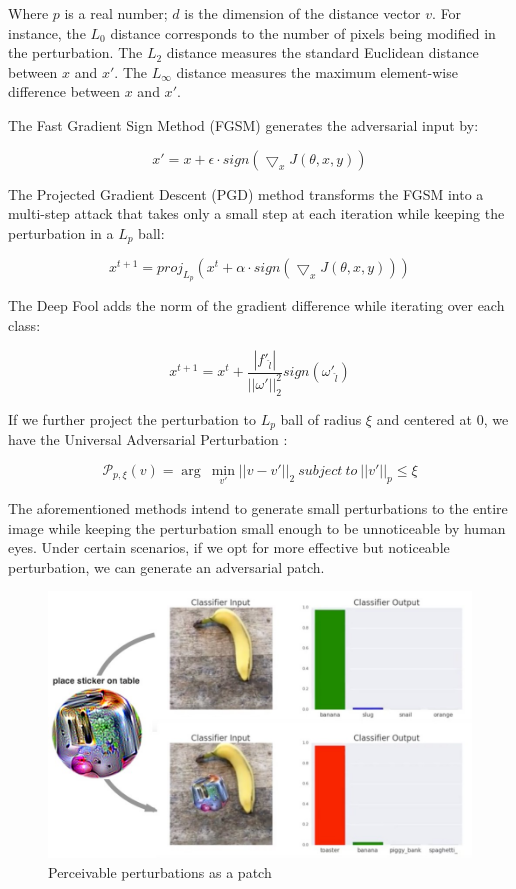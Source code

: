 Where $p$ is a real number; $d$ is the dimension of the distance vector $v$. For instance, the $L_0$ distance corresponds to the number of pixels being modified in the perturbation. The $L_2$ distance measures the standard Euclidean distance between $x$ and $x'$. The $L_\infty$ distance measures the maximum element-wise difference between $x$ and $x'$.

The Fast Gradient Sign Method (FGSM) \cite{goodfellow2015explaining} generates the adversarial input by:

$$ x' = x + \epsilon \cdot sign(\bigtriangledown_x J(\theta, x, y)) $$

The Projected Gradient Descent (PGD) \cite{madry2017towards} method transforms the FGSM into a multi-step attack that takes only a small step at each iteration while keeping the perturbation in a $L_p$ ball:

$$ x^{t+1} = proj_{L_p}(x^t + \alpha \cdot sign(\bigtriangledown_x J(\theta, x, y))) $$

The Deep Fool \cite{moosavidezfooli2016deepfool} adds the norm of the gradient difference while iterating over each class:

$$ x^{t+1} = x^t + \frac{|f'_{\hat{l}}|}{||\omega'||^2_2} sign(\omega'_{\hat{l}})$$

If we further project the perturbation to $L_p$ ball of radius $\xi$ and centered at 0, we have the Universal Adversarial Perturbation \cite{moosavidezfooli2017universal}:

$$\mathcal{P}_{p, \xi}(v) = \arg\ \underset{v'}{\min}||v-v'||_2\ subject\ to\ ||v'||_p\leq\xi$$


The aforementioned methods intend to generate small perturbations to the entire image while keeping the perturbation small enough to be unnoticeable by human eyes. Under certain scenarios, if we opt for more effective but noticeable perturbation, we can generate an adversarial patch.

\begin{figure}[H]
\centering
\includegraphics[scale=0.5]{figures/chapter_intro/adv_patch.jpg}
\caption{Perceivable perturbations as a patch}
\label{fig.adv_patch}
\end{figure}


